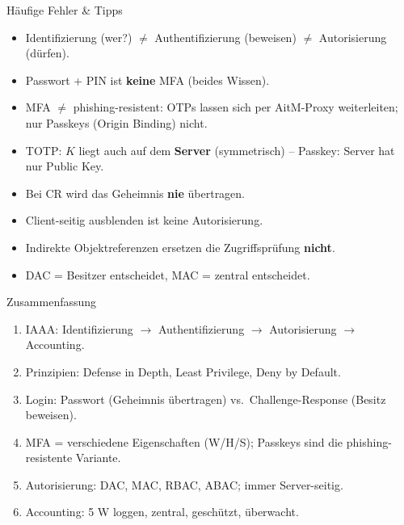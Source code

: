 \documentclass[a4paper, fontsize=7pt]{scrartcl}
\begin{document}
\begin{subbox}{Häufige Fehler \& Tipps}
\begin{itemize}
    \item Identifizierung (wer?) $\neq$ Authentifizierung (beweisen)
          $\neq$ Autorisierung (dürfen).
    \item Passwort + PIN ist \textbf{keine} MFA (beides Wissen).
    \item MFA $\neq$ phishing-resistent: OTPs lassen sich per AitM-Proxy
          weiterleiten; nur Passkeys (Origin Binding) nicht.
    \item TOTP: $K$ liegt auch auf dem \textbf{Server} (symmetrisch) --
          Passkey: Server hat nur Public Key.
    \item Bei CR wird das Geheimnis \textbf{nie} übertragen.
    \item Client-seitig ausblenden ist keine Autorisierung.
    \item Indirekte Objektreferenzen ersetzen die Zugriffsprüfung
          \textbf{nicht}.
    \item DAC = Besitzer entscheidet, MAC = zentral entscheidet.
\end{itemize}
\end{subbox}

\begin{subbox}{Zusammenfassung}
\begin{enumerate}
    \item IAAA: Identifizierung $\to$ Authentifizierung $\to$ Autorisierung
          $\to$ Accounting.
    \item Prinzipien: Defense in Depth, Least Privilege, Deny by Default.
    \item Login: Passwort (Geheimnis übertragen) vs.\ Challenge-Response
          (Besitz beweisen).
    \item MFA = verschiedene Eigenschaften (W/H/S); Passkeys sind die
          phishing-resistente Variante.
    \item Autorisierung: DAC, MAC, RBAC, ABAC; immer Server-seitig.
    \item Accounting: 5 W loggen, zentral, geschützt, überwacht.
\end{enumerate}
\end{subbox}

%
%
%
\end{document}
